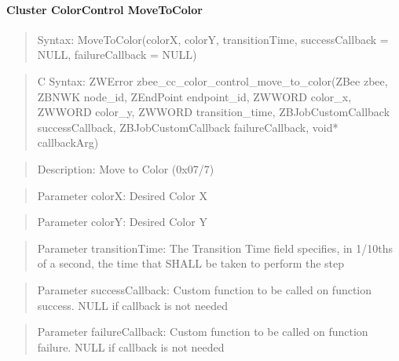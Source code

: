 \paragraph{Cluster ColorControl MoveToColor}
\begin{quote}Syntax: MoveToColor(colorX, colorY, transitionTime, successCallback = NULL, failureCallback = NULL)\end{quote}
\begin{quote}C Syntax: ZWError zbee\_cc\_color\_control\_move\_to\_color(ZBee zbee, ZBNWK node\_id, ZEndPoint endpoint\_id, ZWWORD color\_x, ZWWORD color\_y, ZWWORD transition\_time, ZBJobCustomCallback successCallback, ZBJobCustomCallback failureCallback, void* callbackArg)\end{quote}
\begin{quote}Description: Move to Color (0x07/7)\end{quote}
\begin{quote}Parameter colorX: Desired Color X\end{quote}
\begin{quote}Parameter colorY: Desired Color Y\end{quote}
\begin{quote}Parameter transitionTime: The Transition Time field specifies, in 1/10ths of a second, the time that SHALL be taken to perform the step\end{quote}
\begin{quote}Parameter successCallback: Custom function to be called on function success. NULL if callback is not needed\end{quote}
\begin{quote}Parameter failureCallback: Custom function to be called on function failure. NULL if callback is not needed\end{quote}


